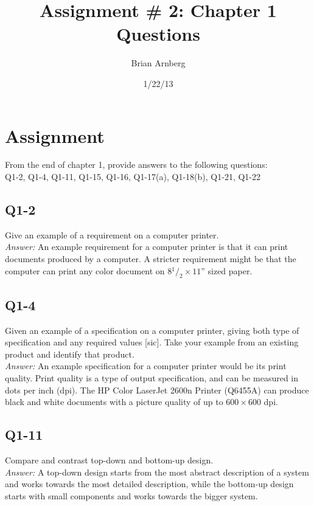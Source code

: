 \documentclass{article}
\title{Assignment \# 2: Chapter 1 Questions}
\date{1/22/13}
\author{Brian Arnberg}
\begin{document}
\label{start}

	\maketitle
	\thispagestyle{empty}


\section*{ Assignment }
From the end of chapter 1, provide answers to the following questions:\\
Q1-2, Q1-4, Q1-11, Q1-15, Q1-16, Q1-17(a), Q1-18(b), Q1-21, Q1-22

\subsection*{ Q1-2  } %
Give an example of a requirement on a computer printer.
\\
\emph{Answer:}
An example requirement for a computer printer is that it can print documents produced by a computer. A stricter requirement might be that the computer can print any color document on $8{}^1/_2\times11$'' sized paper. 


\subsection*{ Q1-4  }%
Given an example of a specification on a computer printer, giving both type of specification and any required values [sic]. Take your example from an existing product and identify that product.
\\
\emph{Answer:}
An example specification for a computer printer would be its print quality. Print quality is a type of output specification, and can be measured in dots per inch (dpi). The HP Color LaserJet 2600n Printer (Q6455A) can produce black and white documents with a picture quality of up to $600\times600$ dpi. 


\subsection*{ Q1-11 }%
Compare and contrast top-down and bottom-up design.
\\
\emph{Answer:}
A top-down design starts from the most abstract description of a system and works towards the most detailed description, while the bottom-up design starts with small components and works towards the bigger system. 
\end{document}
